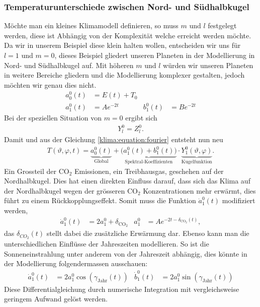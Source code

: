 \begin{refsection}
\subsubsection{Temperaturunterschiede zwischen Nord- und Südhalbkugel
\label{klima:subsubsection:halbkugel}}
%
Möchte man ein kleines Klimamodell definieren, so muss  $m$ und $l$
festgelegt werden, diese ist Abhängig von der Komplexität welche
erreicht werden möchte. Da wir in unserem Beispiel diese klein
halten wollen, entscheiden wir uns für $l=1$ und $m=0$, dieses
Beispiel gliedert unseren Planeten in der Modellierung in Nord- und
Südhalbkugel auf. Mit höheren $m$ und $l$ würden wir unseren Planeten
in weitere Bereiche gliedern und die Modellierung komplexer gestalten,
jedoch möchten wir genau dies nicht.
\begin{align*}
a^0_0(t)&=E(t)+T_0
\\
a^0_1(t) &=Ae^{-2t}&
b^0_1(t) &=Be^{-2t}
\end{align*}
Bei der speziellen Situation von $m=0$ ergibt sich
\begin{align*}
Y^0_l=Z^0_l.
\end{align*}
Damit und aus der Gleichung \eqref{klima:equation:fourier} entsteht nun neu
\begin{align}
T(\vartheta ,\varphi ,t)
=
\underbrace{a^0_0(t)}_{\text{Global}} + \underbrace{\bigl( a^0_1(t)+b^0_1(t) \bigr)}_{\text{Spektral-Koeffizienten}} \cdot \underbrace{Y^0_1(\vartheta ,\varphi)}_{\text{Kugelfunktion}}.
\end{align}
Ein Grossteil der CO$_2$ Emissionen, ein Treibhausgas, geschehen
auf der Nordhalbkugel. Dies hat einen direkten Einfluss darauf,
dass sich das Klima auf der Nordhalbkugel wegen der grösseren CO$_2$
Konzentrationen mehr erwärmt, dies führt zu einem Rückkopplungseffekt.
Somit muss die Funktion $\dot a^0_1(t)$ modifiziert werden,
\begin{align*}
\dot a^0_1(t) &= 2a_1^0+\delta_{\text{CO}_2} &
a_1^0 &= Ae^{-2t-\delta_{\text{CO}_2}(t)},
\end{align*}
das $\delta_{CO_2}(t)$ stellt dabei die zusätzliche Erwärmung dar.
Ebenso kann man die unterschiedlichen Einflüsse der Jahreszeiten
modellieren. So ist die Sonneneinstrahlung unter anderem von der
Jahreszeit abhängig, dies könnte in der Modellierung folgendermassen
ausschauen:
\begin{align*}
\dot a_1^0(t) &= 2a_1^0 \cos(\gamma_{\text{Jahr}}(t)) &
\dot b_1^0(t) &= 2a_1^0 \sin(\gamma_{\text{Jahr}}(t))
\end{align*}
Diese Differentialgleichung durch numerische Integration mit vergleichsweise
geringem Aufwand gelöst werden.


\end{refsection}
